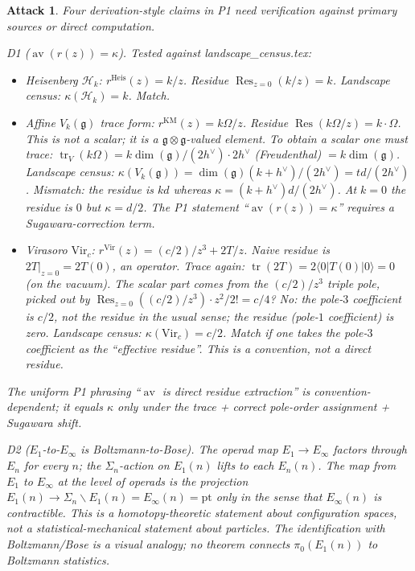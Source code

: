 \documentclass[11pt]{article}
\newtheorem*{attack}{Attack}
\theoremstyle{definition}
\DeclareMathOperator{\av}{av}
\DeclareMathOperator{\tr}{tr}
\DeclareMathOperator{\Res}{Res}
\begin{document}
\begin{attack}
Four derivation-style claims in P1 need verification against primary
sources or direct computation.

\emph{D1 ($\av(r(z)) = \kappa$).} Tested against landscape\_census.tex:
\begin{itemize}
\item Heisenberg $\mathcal H_k$: $r^{\mathrm{Heis}}(z) = k/z$. Residue
$\Res_{z=0}(k/z) = k$. Landscape census: $\kappa(\mathcal H_k) = k$. Match.
\item Affine $V_k(\mathfrak g)$ trace form: $r^{\mathrm{KM}}(z) = k\Omega/z$.
Residue $\Res(k\Omega/z) = k\cdot\Omega$. This is \emph{not} a scalar;
it is a $\mathfrak g\otimes\mathfrak g$-valued element. To obtain a
scalar one must trace: $\tr_V(k\Omega) = k \dim(\mathfrak g) /(2h^\vee) \cdot 2h^\vee$
(Freudenthal) $= k\dim(\mathfrak g)$. Landscape census: $\kappa(V_k(\mathfrak g)) =
\dim(\mathfrak g)(k+h^\vee)/(2h^\vee) = td/(2h^\vee)$. \emph{Mismatch}: the
residue is $kd$ whereas $\kappa = (k+h^\vee)d/(2h^\vee)$. At $k = 0$
the residue is $0$ but $\kappa = d/2$. The P1 statement
``$\av(r(z)) = \kappa$'' requires a Sugawara-correction term.
\item Virasoro $\mathrm{Vir}_c$: $r^{\mathrm{Vir}}(z) = (c/2)/z^3 + 2T/z$.
Naive residue is $2T|_{z=0} = 2T(0)$, an operator. Trace again:
$\tr(2T) = 2 \langle 0 | T(0) | 0 \rangle = 0$ (on the vacuum). The
scalar part comes from the $(c/2)/z^3$ triple pole, picked out by
$\Res_{z=0}((c/2)/z^3) \cdot z^2 / 2! = c/4$? No: the pole-$3$
coefficient is $c/2$, not the residue in the usual sense; the residue
(pole-$1$ coefficient) is zero. Landscape census: $\kappa(\mathrm{Vir}_c) = c/2$.
Match \emph{if} one takes the pole-$3$ coefficient as the ``effective
residue''. This is a convention, not a direct residue.
\end{itemize}
The uniform P1 phrasing ``$\av$ is direct residue extraction'' is
convention-dependent; it equals $\kappa$ only under the trace + correct
pole-order assignment + Sugawara shift.

\emph{D2 ($E_1$-to-$E_\infty$ is Boltzmann-to-Bose).} The operad map
$E_1 \to E_\infty$ factors through $E_n$ for every $n$; the
$\Sigma_n$-action on $E_1(n)$ lifts to each $E_n(n)$. The map from
$E_1$ to $E_\infty$ at the level of operads is the projection
$E_1(n) \to \Sigma_n\backslash E_1(n) = E_\infty(n) = \mathrm{pt}$
only in the sense that $E_\infty(n)$ is contractible. This is a
homotopy-theoretic statement about configuration spaces, not a
statistical-mechanical statement about particles. The identification
with Boltzmann/Bose is a visual analogy; no theorem connects
$\pi_0(E_1(n))$ to Boltzmann statistics.


\end{attack}
\end{document}
